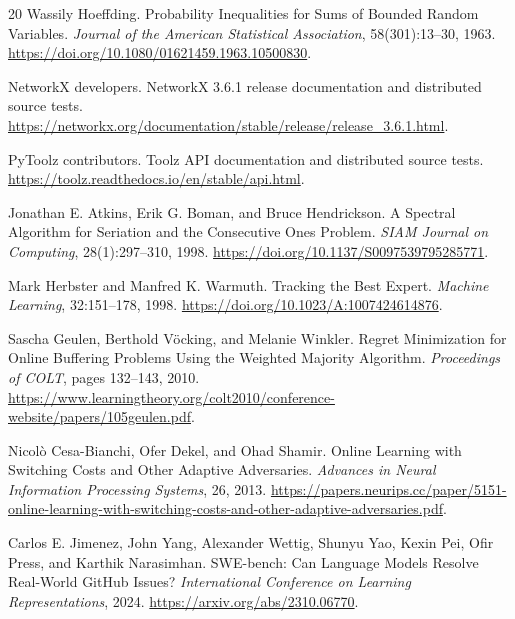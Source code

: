 \begin{thebibliography}{20}
 Wassily Hoeffding.
\newblock Probability Inequalities for Sums of Bounded Random Variables.
\newblock \emph{Journal of the American Statistical Association}, 58(301):13--30, 1963.
\newblock \url{https://doi.org/10.1080/01621459.1963.10500830}.

 NetworkX developers.
\newblock NetworkX 3.6.1 release documentation and distributed source tests.
\newblock \url{https://networkx.org/documentation/stable/release/release_3.6.1.html}.

 PyToolz contributors.
\newblock Toolz API documentation and distributed source tests.
\newblock \url{https://toolz.readthedocs.io/en/stable/api.html}.

 Jonathan E. Atkins, Erik G. Boman, and Bruce Hendrickson.
\newblock A Spectral Algorithm for Seriation and the Consecutive Ones Problem.
\newblock \emph{SIAM Journal on Computing}, 28(1):297--310, 1998.
\newblock \url{https://doi.org/10.1137/S0097539795285771}.

 Mark Herbster and Manfred K. Warmuth.
\newblock Tracking the Best Expert.
\newblock \emph{Machine Learning}, 32:151--178, 1998.
\newblock \url{https://doi.org/10.1023/A:1007424614876}.

 Sascha Geulen, Berthold V\"ocking, and Melanie Winkler.
\newblock Regret Minimization for Online Buffering Problems Using the Weighted Majority Algorithm.
\newblock \emph{Proceedings of COLT}, pages 132--143, 2010.
\newblock \url{https://www.learningtheory.org/colt2010/conference-website/papers/105geulen.pdf}.

 Nicol\`o Cesa-Bianchi, Ofer Dekel, and Ohad Shamir.
\newblock Online Learning with Switching Costs and Other Adaptive Adversaries.
\newblock \emph{Advances in Neural Information Processing Systems}, 26, 2013.
\newblock \url{https://papers.neurips.cc/paper/5151-online-learning-with-switching-costs-and-other-adaptive-adversaries.pdf}.

 Carlos E. Jimenez, John Yang, Alexander Wettig, Shunyu Yao, Kexin Pei, Ofir Press, and Karthik Narasimhan.
\newblock SWE-bench: Can Language Models Resolve Real-World GitHub Issues?
\newblock \emph{International Conference on Learning Representations}, 2024.
\newblock \url{https://arxiv.org/abs/2310.06770}.

\end{thebibliography}

